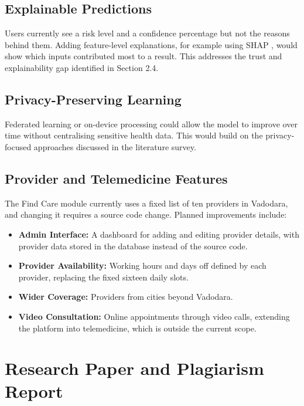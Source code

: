 \section{Explainable Predictions}

Users currently see a risk level and a confidence percentage but not the reasons behind them. Adding feature-level explanations, for example using SHAP \cite{lundberg2017}, would show which inputs contributed most to a result. This addresses the trust and explainability gap identified in Section 2.4.

\section{Privacy-Preserving Learning}

Federated learning or on-device processing could allow the model to improve over time without centralising sensitive health data. This would build on the privacy-focused approaches discussed in the literature survey.

\section{Provider and Telemedicine Features}

The Find Care module currently uses a fixed list of ten providers in Vadodara, and changing it requires a source code change. Planned improvements include:

\begin{itemize}
    \item \textbf{Admin Interface:} A dashboard for adding and editing provider details, with provider data stored in the database instead of the source code.
    \item \textbf{Provider Availability:} Working hours and days off defined by each provider, replacing the fixed sixteen daily slots.
    \item \textbf{Wider Coverage:} Providers from cities beyond Vadodara.
    \item \textbf{Video Consultation:} Online appointments through video calls, extending the platform into telemedicine, which is outside the current scope.
\end{itemize}



\chapter{Research Paper and Plagiarism Report}

